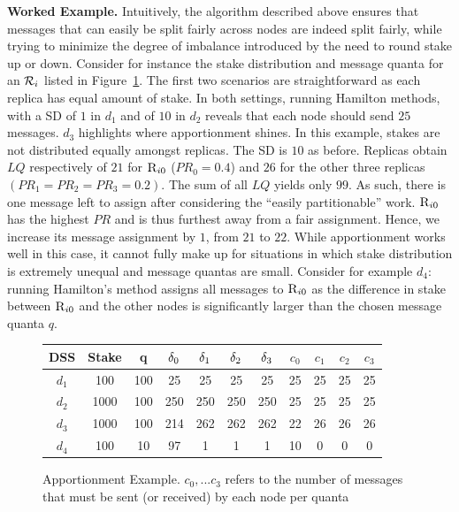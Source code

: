 \par \textbf{Worked Example.} Intuitively, the algorithm described above ensures that messages that can easily be split fairly across nodes are indeed split fairly, while trying to minimize the degree of imbalance introduced by the need to round stake up or down. Consider for instance the stake distribution and message quanta for an \RSM{} $\mathcal{R}_{i}$ listed in Figure~\ref{table:apportionment}. The first two scenarios are straightforward as each replica has equal amount of stake. In both settings, running Hamilton methods, with a SD of $1$ in $d_1$ and of $10$ in $d_2$ reveals that each node should send $25$ messages.  $d_3$ highlights where apportionment shines. In this example, stakes are not distributed equally amongst replicas. The SD is $10$ as before. Replicas obtain $LQ$ respectively of $21$ for $\textsc{R}_{{i}{0}}$ 
($PR_0=0.4$) and $26$ for the other three replicas $(PR_1=PR_2=PR_3=0.2)$. The sum of all $LQ$ yields only $99$. As such, there is one message left to assign after considering the ``easily partitionable'' work. $\textsc{R}_{{i}{0}}$ has the highest $PR$ and is thus furthest away from a fair assignment. Hence, we increase its message assignment by $1$, from $21$ to $22$. While apportionment works well in this case, it cannot fully make up for situations in which stake distribution is extremely unequal and message quantas are small. Consider for example $d_4$: running Hamilton's method assigns all messages to $\textsc{R}_{{i}{0}}$ as the difference in stake between $\textsc{R}_{{i}{0}}$ and the other nodes is significantly larger than the chosen message quanta $q$.

\begin{figure}
    \scriptsize
    \centering
    \setlength{\tabcolsep}{5pt}
    \begin{tabular}{|c|c|c||c|c|c|c||c|c|c|c|}
    \hline
     DSS & Stake & q & ${\delta}_{0}$ & ${\delta}_{1}$ & ${\delta}_{2}$ & ${\delta}_{3}$ & $c_0$ & $c_1$ & $c_2$ & $c_3$  \\\hline
     $d_1$ & 100   & 100 & 25 & 25 & 25 & 25 & 25 & 25 & 25 & 25 \\ \hline
     $d_2$ & 1000 & 100 & 250 & 250 & 250 & 250 & 25 & 25 & 25 & 25 \\ \hline
     $d_3$ & 1000 & 100 & 214 & 262 & 262 & 262 & 22 & 26 & 26 & 26 \\ \hline
     $d_4$ & 100 & 10 &  97 & 1 & 1 & 1 & 10 & 0 & 0 & 0 \\ \hline
    \end{tabular}
\caption{Apportionment Example. $c_0,...c_3$ refers to the number of messages that must be sent (or received) by each node per quanta}
\label{table:apportionment}
\end{figure}

